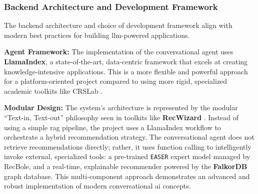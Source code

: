 \subsubsection{Backend Architecture and Development Framework}

The backend architecture and choice of development framework align with modern best practices for building \ac{llm}-powered applications.

\begin{compactitem}[\textbullet]
    \item \textbf{Agent Framework:} The implementation of the conversational agent uses \textbf{LlamaIndex}, a state-of-the-art, data-centric framework that excels at creating knowledge-intensive applications. This is a more flexible and powerful approach for a platform-oriented project compared to using more rigid, specialized academic toolkits like CRSLab \cite{CRSLAB}.

    \item \textbf{Modular Design:} The system's architecture is represented by the modular ``Text-in, Text-out'' philosophy seen in toolkits like \textbf{RecWizard} \cite{RECWIZARD}. Instead of using a simple \ac{rag} pipeline, the project uses a LlamaIndex workflow to orchestrate a hybrid recommendation strategy. The conversational agent does not retrieve recommendations directly; rather, it uses function calling to intelligently invoke external, specialized tools: a pre-trained \texttt{EASER} expert model managed by RecBole, and a real-time, explainable recommender powered by the \textbf{FalkorDB} graph database. This multi-component approach demonstrates an advanced and robust implementation of modern conversational \acs{ai} concepts.
\end{compactitem}